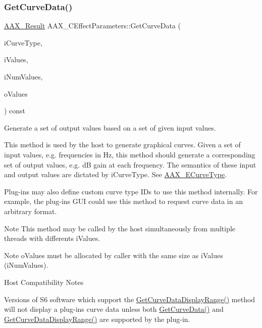 \subsubsection{\texorpdfstring{GetCurveData()}{GetCurveData()}}
{\footnotesize\ttfamily \mbox{\hyperlink{a00392_a4d8f69a697df7f70c3a8e9b8ee130d2f}{A\+A\+X\+\_\+\+Result}} A\+A\+X\+\_\+\+C\+Effect\+Parameters\+::\+Get\+Curve\+Data (\begin{DoxyParamCaption}\item[{\mbox{\hyperlink{a00392_ac678f9c1fbcc26315d209f71a147a175}{A\+A\+X\+\_\+\+C\+Type\+ID}}}]{i\+Curve\+Type,  }\item[{const float $\ast$}]{i\+Values,  }\item[{uint32\+\_\+t}]{i\+Num\+Values,  }\item[{float $\ast$}]{o\+Values }\end{DoxyParamCaption}) const\hspace{0.3cm}{\ttfamily [virtual]}}



Generate a set of output values based on a set of given input values. 

This method is used by the host to generate graphical curves. Given a set of input values, e.\+g. frequencies in Hz, this method should generate a corresponding set of output values, e.\+g. dB gain at each frequency. The semantics of these input and output values are dictated by {\ttfamily i\+Curve\+Type}. See \mbox{\hyperlink{a00812_ga59c73d8f51c5c55d54a728eff39da884}{A\+A\+X\+\_\+\+E\+Curve\+Type}}.

Plug-\/ins may also define custom curve type I\+Ds to use this method internally. For example, the plug-\/in\textquotesingle{}s G\+UI could use this method to request curve data in an arbitrary format.


\begin{DoxyItemize}
\item \begin{DoxyNote}{Note}
This method may be called by the host simultaneously from multiple threads with differents {\ttfamily i\+Values}.
\end{DoxyNote}

\item \begin{DoxyNote}{Note}
{\ttfamily o\+Values} must be allocated by caller with the same size as {\ttfamily i\+Values} ({\ttfamily i\+Num\+Values}).
\end{DoxyNote}
\begin{DoxyRefDesc}{Host Compatibility Notes}
\item[\mbox{\hyperlink{a00786__compatibility_notes000053}{Host Compatibility Notes}}]Versions of S6 software which support the \mbox{\hyperlink{a00812_ga38d1ac0c15a7052904077ef0e2527e0d}{Get\+Curve\+Data\+Display\+Range()}} method will not display a plug-\/in\textquotesingle{}s curve data unless both \mbox{\hyperlink{a00812_gaa85bda4027342eb644a9c92a17da6d49}{Get\+Curve\+Data()}} and \mbox{\hyperlink{a00812_ga38d1ac0c15a7052904077ef0e2527e0d}{Get\+Curve\+Data\+Display\+Range()}} are supported by the plug-\/in.\end{DoxyRefDesc}

\end{DoxyItemize}

